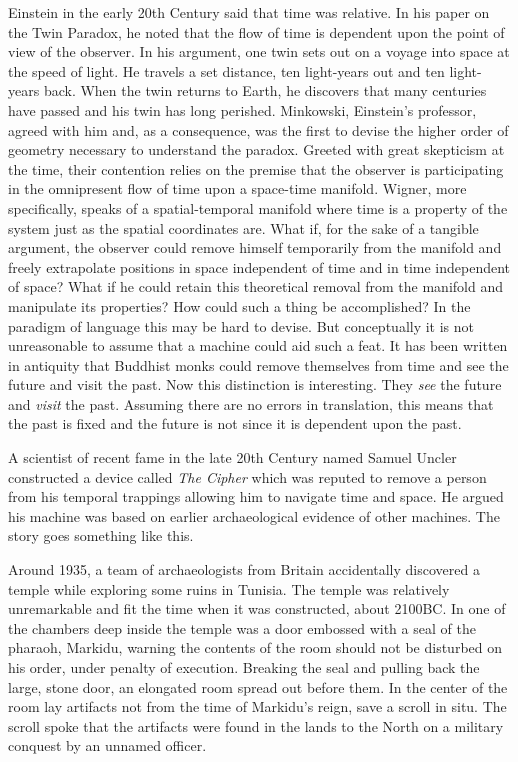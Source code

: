 \documentclass[
]{article}
\begin{document}
Einstein in the early 20th Century said that time was relative. In his
paper on the Twin Paradox, he noted that the flow of time is dependent
upon the point of view of the observer. In his argument, one twin sets
out on a voyage into space at the speed of light. He travels a set
distance, ten light-years out and ten light-years back. When the twin
returns to Earth, he discovers that many centuries have passed and his
twin has long perished. Minkowski, Einstein's professor, agreed with him
and, as a consequence, was the first to devise the higher order of
geometry necessary to understand the paradox. Greeted with great
skepticism at the time, their contention relies on the premise that the
observer is participating in the omnipresent flow of time upon a
space-time manifold. Wigner, more specifically, speaks of a
spatial-temporal manifold where time is a property of the system just as
the spatial coordinates are. What if, for the sake of a tangible
argument, the observer could remove himself temporarily from the
manifold and freely extrapolate positions in space independent of time
and in time independent of space? What if he could retain this
theoretical removal from the manifold and manipulate its properties? How
could such a thing be accomplished? In the paradigm of language this may
be hard to devise. But conceptually it is not unreasonable to assume
that a machine could aid such a feat. It has been written in antiquity
that Buddhist monks could remove themselves from time and see the future
and visit the past. Now this distinction is interesting. They \emph{see}
the future and \emph{visit} the past. Assuming there are no errors in
translation, this means that the past is fixed and the future is not
since it is dependent upon the past.

A scientist of recent fame in the late 20th Century named Samuel Uncler
constructed a device called \emph{The Cipher} which was reputed to
remove a person from his temporal trappings allowing him to navigate
time and space. He argued his machine was based on earlier
archaeological evidence of other machines. The story goes something like
this.

Around 1935, a team of archaeologists from Britain accidentally
discovered a temple while exploring some ruins in Tunisia. The temple
was relatively unremarkable and fit the time when it was constructed,
about 2100BC. In one of the chambers deep inside the temple was a door
embossed with a seal of the pharaoh, Markidu, warning the contents of
the room should not be disturbed on his order, under penalty of
execution. Breaking the seal and pulling back the large, stone door, an
elongated room spread out before them. In the center of the room lay
artifacts not from the time of Markidu's reign, save a scroll in situ.
The scroll spoke that the artifacts were found in the lands to the North
on a military conquest by an unnamed officer.
\end{document}
